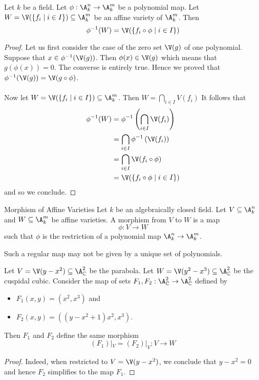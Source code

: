 \documentclass[a4paper]{article}
\begin{document}
\begin{prp}{}{} Let $k$ be a field. Let $\phi:\A_k^n\to\A_k^m$ be a polynomial map. Let $W=\V(\{f_i\;|\;i\in I\})\subseteq\A_k^m$ be an affine variety of $\A_k^m$. Then $$\phi^{-1}(W)=\V(\{f_i\circ\phi\;|\;i\in I\})$$ 
\begin{proof}
Let us first consider the case of the zero set $\V(g)$ of one polynomial. Suppose that $x\in\phi^{-1}(\V(g))$. Then $\phi(x)\in\V(g)$ which means that $g(\phi(x))=0$. The converse is entirely true. Hence we proved that $\phi^{-1}(\V(g))=\V(g\circ\phi)$. \\~\\

Now let $W=\V(\{f_i\;|\;i\in I\})\subseteq\A_k^m$. Then $W=\bigcap_{i\in I}V(f_i)$ It follows that 
\begin{align*}
\phi^{-1}(W)&=\phi^{-1}\left(\bigcap_{i\in I}\V(f_i)\right)\\
&=\bigcap_{i\in I}\phi^{-1}\left(\V(f_i)\right)\\
&=\bigcap_{i\in I}\V(f_i\circ\phi)\\
&=\V(\{f_i\circ\phi\;|\;i\in I\})
\end{align*}
and so we conclude. 
\end{proof}
\end{prp}

\begin{defn}{Morphism of Affine Varieties}{} Let $k$ be an algebraically closed field. Let $V\subseteq\A_k^n$ and $W\subseteq\A_k^m$ be affine varieties. A morphism from $V$ to $W$ is a map $$\phi:V\to W$$ such that $\phi$ is the restriction of a polynomial map $\A_k^n\to\A_k^m$. 
\end{defn}

Such a regular map may not be given by a unique set of polynomials. 

\begin{eg}{}{} Let $V=\V(y-x^2)\subseteq\A_\C^2$ be the parabola. Let $W=\V(y^2-x^3)\subseteq\A_\C^2$ be the cuspidal cubic. Consider the map of sets $F_1,F_2:\A_\C^2\to\A_\C^2$ defined by
\begin{itemize}
\item $F_1(x,y)=(x^2,x^3)$ and 
\item $F_2(x,y)=((y-x^2+1)x^2,x^3)$. 
\end{itemize}
Then $F_1$ and $F_2$ define the same morphism $$(F_1)|_V=(F_2)|_V:V\to W$$ 
\begin{proof}
Indeed, when restricted to $V=\V(y-x^2)$, we conclude that $y-x^2=0$ and hence $F_2$ simplifies to the map $F_1$. 
\end{proof}
\end{eg}
\end{document}
